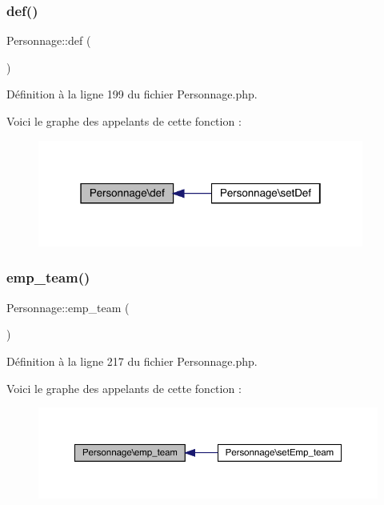 \subsubsection{\texorpdfstring{def()}{def()}}
{\footnotesize\ttfamily Personnage\+::def (\begin{DoxyParamCaption}{ }\end{DoxyParamCaption})}



Définition à la ligne 199 du fichier Personnage.\+php.

Voici le graphe des appelants de cette fonction \+:\nopagebreak
\begin{figure}[H]
\begin{center}
\leavevmode
\includegraphics[width=304pt]{class_personnage_adcc095fcc5f137e90860386b4b977817_icgraph}
\end{center}
\end{figure}
\mbox{\label{class_personnage_a7c3150644dfeedeae54ca86e43bc29a0}} 
\subsubsection{\texorpdfstring{emp\+\_\+team()}{emp\_team()}}
{\footnotesize\ttfamily Personnage\+::emp\+\_\+team (\begin{DoxyParamCaption}{ }\end{DoxyParamCaption})}



Définition à la ligne 217 du fichier Personnage.\+php.

Voici le graphe des appelants de cette fonction \+:\nopagebreak
\begin{figure}[H]
\begin{center}
\leavevmode
\includegraphics[width=350pt]{class_personnage_a7c3150644dfeedeae54ca86e43bc29a0_icgraph}
\end{center}
\end{figure}
\mbox{\label{class_personnage_aae5ecffa3c0802af6664ad0f3b396561}} 
